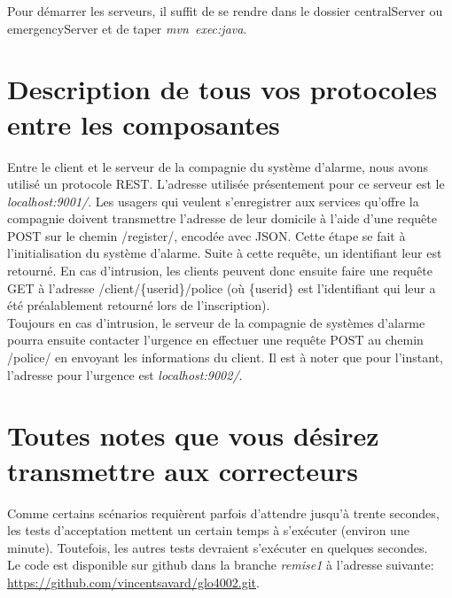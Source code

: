 Pour démarrer les serveurs, il suffit de se rendre dans le dossier centralServer ou emergencyServer et de taper \emph{mvn\ exec:java}.


\section*{Description de tous vos protocoles entre les composantes}
Entre le client et le serveur de la compagnie du système d'alarme, nous avons utilisé un protocole REST. L'adresse utilisée présentement pour ce serveur est le \emph{localhost:9001/}. Les usagers qui veulent s'enregistrer aux services qu'offre la compagnie doivent transmettre l'adresse de leur domicile à l'aide d'une requête POST sur le chemin /register/, encodée avec JSON. Cette étape se fait à l'initialisation du système d'alarme. Suite à cette requête, un identifiant leur est retourné. En cas d'intrusion, les clients peuvent donc ensuite faire une requête GET à l'adresse /client/\{userid\}/police (où \{userid\} est l'identifiant qui leur a été préalablement retourné lors de l'inscription). \\

Toujours en cas d'intrusion, le serveur de la compagnie de systèmes d'alarme pourra ensuite contacter l'urgence en effectuer une requête POST au chemin /police/ en envoyant les informations du client. Il est à noter que pour l'instant, l'adresse pour l'urgence est \emph{localhost:9002/}.

\section*{Toutes notes que vous désirez transmettre aux correcteurs}
Comme certains scénarios requièrent parfois d'attendre jusqu'à trente secondes, les tests d'acceptation mettent un certain temps à s'exécuter (environ une minute). Toutefois, les autres tests devraient s'exécuter en quelques secondes. \\
Le code est disponible sur github dans la branche \emph{remise1} à l'adresse suivante:\\ \url{https://github.com/vincentsavard/glo4002.git}. 
